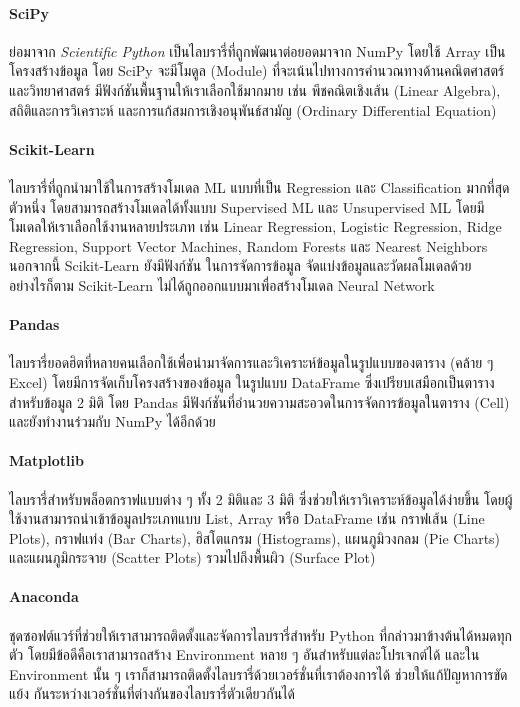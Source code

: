 \paragraph{SciPy} 
ย่อมาจาก \textit{Scientific Python} เป็นไลบรารี่ที่ถูกพัฒนาต่อยอดมาจาก NumPy โดยใช้ Array เป็นโครงสร้างข้อมูล
โดย SciPy จะมีโมดูล (Module) ที่จะเน้นไปทางการคำนวณทางด้านคณิตศาสตร์และวิทยาศาสตร์ มีฟังก์ชันพื้นฐานให้เราเลือกใช้มากมาย เช่น 
พีชคณิตเชิงเส้น (Linear Algebra), สถิติและการวิเคราะห์ และการแก้สมการเชิงอนุพันธ์สามัญ (Ordinary Differential Equation)

\paragraph{Scikit-Learn}
ไลบรารี่ที่ถูกนำมาใช้ในการสร้างโมเดล ML แบบที่เป็น Regression และ Classification มากที่สุดตัวหนึ่ง โดยสามารถสร้างโมเดลได้ทั้งแบบ 
Supervised ML และ Unsupervised ML โดยมีโมเดลให้เราเลือกใช้งานหลายประเภท เช่น Linear Regression, Logistic Regression, 
Ridge Regression, Support Vector Machines, Random Forests และ Nearest Neighbors นอกจากนี้ Scikit-Learn ยังมีฟังก์ชัน%
ในการจัดการข้อมูล จัดแบ่งข้อมูลและวัดผลโมเดลด้วย อย่างไรก็ตาม Scikit-Learn ไม่ได้ถูกออกแบบมาเพื่อสร้างโมเดล Neural Network

\paragraph{Pandas}
ไลบรารี่ยอดฮิตที่หลายคนเลือกใช้เพื่อนำมาจัดการและวิเคราะห์ข้อมูลในรูปแบบของตาราง (คล้าย ๆ Excel) โดยมีการจัดเก็บโครงสร้างของข้อมูล%
ในรูปแบบ DataFrame ซึ่งเปรียบเสมือกเป็นตารางสำหรับข้อมูล 2 มิติ โดย Pandas มีฟังก์ชันที่อำนวยความสะอวดในการจัดการข้อมูลในตาราง (Cell) 
และยังทำงานร่วมกับ NumPy ได้อีกด้วย

\paragraph{Matplotlib}
ไลบรารี่สำหรับพล็อตกราฟแบบต่าง ๆ ทั้ง 2 มิติและ 3 มิติ ซึ่งช่วยให้เราวิเคราะห์ข้อมูลได้ง่ายขึ้น โดยผู้ใช้งานสามารถนำเข้าข้อมูลประเภทแบบ 
List, Array หรือ DataFrame เช่น กราฟเส้น (Line Plots), กราฟแท่ง (Bar Charts), ฮิสโตแกรม (Histograms), แผนภูมิวงกลม 
(Pie Charts) และแผนภูมิกระจาย (Scatter Plots) รวมไปถึงพื้นผิว (Surface Plot)

\paragraph{Anaconda}
ชุดซอฟต์แวร์ที่ช่วยให้เราสามารถติดตั้งและจัดการไลบรารี่สำหรับ Python ที่กล่าวมาข้างต้นได้หมดทุกตัว โดยมีข้อดีคือเราสามารถสร้าง Environment 
หลาย ๆ อันสำหรับแต่ละโปรเจกต์ได้ และใน Environment นั้น ๆ เราก็สามารถติดตั้งไลบรารี่ด้วยเวอร์ชั่นที่เราต้องการได้ ช่วยให้แก้ปัญหาการขัดแย้ง%
กันระหว่างเวอร์ชั่นที่ต่างกันของไลบรารี่ตัวเดียวกันได้

